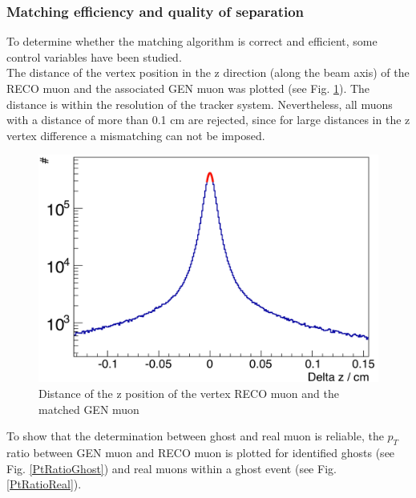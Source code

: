 \subsubsection{Matching efficiency and quality of separation}
To determine whether the matching algorithm is correct and efficient, some control variables have been studied.\\
The distance of the vertex position in the z direction (along the beam axis) of the RECO muon and the associated GEN muon was plotted (see Fig. \ref{DeltaZMatching}). The distance is within the resolution of the tracker system. Nevertheless, all muons with a distance of more than 0.1 cm are rejected, since for large distances in the z vertex difference a mismatching can not be imposed.\\
\begin{figure}[htbp]
\centering
\begin{minipage}[t]{0.95\textwidth}
\includegraphics[width=\textwidth]{Figures/scheuch/DeltaZ.png}
\caption{Distance of the z position of the vertex RECO muon and the matched GEN muon}
\label{DeltaZMatching}
\end{minipage}
\end{figure}
To show that the determination between ghost and real muon is reliable, the $p_{T}$ ratio between GEN muon and RECO muon is plotted for identified ghosts (see Fig. \ref{PtRatioGhost}) and real muons within a ghost event (see Fig. \ref{PtRatioReal}).
